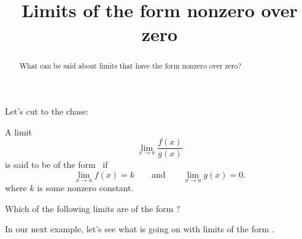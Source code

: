 \documentclass{ximera}
\title[Dig-In:]{Limits of the form nonzero over zero}
\begin{document}
\begin{abstract}
  What can be said about limits that have the form nonzero over zero?
\end{abstract}

\maketitle

Let's cut to the chase:

\begin{definition}
  A limit
  \[
  \lim_{x\to a} \frac{f(x)}{g(x)}
  \]
  is said to be of the form \numOverZero\ if
  \[
  \lim_{x\to a} f(x) = k\qquad\text{and}\qquad \lim_{x\to a} g(x) =0.
  \]
  where $k$ is some nonzero constant.
\end{definition}

\begin{question}
  Which of the following limits are of the form \numOverZero?
  \begin{selectAll}
  \end{selectAll}
\end{question}

In our next example, let's see what is going on with limits of the
form \numOverZero.
\end{document}
